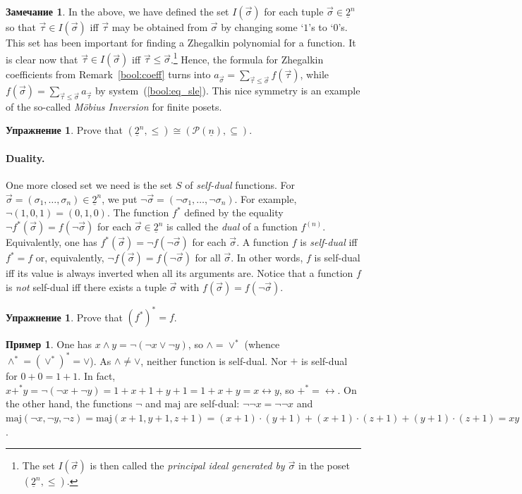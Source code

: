 \documentclass[12pt,notitlepage]{article}
\theoremstyle{plain}
\theoremstyle{definition}
\newtheorem{exc}[thm]{Упражнение}
\newtheorem{exm}[thm]{Пример}
\newtheorem{rem}[thm]{Замечание}
\theoremstyle{plain}
\newcommand{\sbs}{\subseteq}
\newcommand{\mP}{\mathcal{P}}
\newcommand{\ul}[1]{\underline{#1}}
\newcommand{\1}{\mathbf{1}}
\newcommand{\0}{\mathbf{0}}
\begin{document}
\begin{rem}
	In the above, we have defined the set $I(\vec \sigma)$ for each tuple $\vec \sigma \in \ul{2}^n$ so that $\vec \tau \in I(\vec\sigma)$ iff $\vec \tau$  may be obtained from $\vec \sigma$ by changing some `$1$'s to `$0$'s. This set has been important for finding a Zhegalkin polynomial for a function. It is clear now that $\vec \tau \in I(\vec \sigma)$ iff $\vec \tau \leq \vec \sigma$.\footnote{The set $I(\vec \sigma)$ is then called the \emph{principal ideal generated by $\vec \sigma$} in the poset $(\ul{2}^n, {\leq})$.} Hence, the formula for Zhegalkin coefficients from Remark~\ref{bool:coeff} turns into $a_{\vec \sigma} = \sum_{\vec\tau \leq \vec \sigma} f(\vec\tau)$, while $f(\vec \sigma) = \sum_{\vec\tau \leq \vec \sigma} a_{\vec\tau}$ by system~(\ref{bool:eq_sle}). This nice symmetry is an example of the so-called \emph{M\"obius Inversion} for finite posets.
\end{rem}
\begin{exc}
	Prove that $(\ul{2}^n, {\leq}) \cong (\mP(\ul{n}), {\sbs})$.
\end{exc}

\paragraph{Duality.}
One more closed set we need is the set $S$ of \emph{self-dual} functions. For $\vec \sigma = (\sigma_1, \ldots, \sigma_n) \in \ul{2}^n$, we put $\neg\vec\sigma = (\neg\sigma_1, \ldots, \neg\sigma_n)$. For example, $\neg (1,0,1) = (0,1,0)$. The function $f^*$ defined by the equality $\neg f^*(\vec \sigma) = f(\neg\vec\sigma)$ for each $\vec \sigma \in \ul{2}^n$ is called the \emph{dual} of a function $f^{(n)}$. Equivalently, one has $f^*(\vec \sigma) = \neg f(\neg\vec\sigma)$ for each $\vec \sigma$. A function $f$ is \emph{self-dual} iff $f^* = f$ or, equivalently, $\neg f(\vec \sigma) = f(\neg\vec\sigma)$ for all $\vec \sigma$. In other words, $f$ is self-dual iff its value is always inverted when all its arguments are. Notice that a function $f$ is \emph{not} self-dual iff there exists a tuple $\vec\sigma$ with $f(\vec \sigma) = f(\neg\vec \sigma)$.

\begin{exc}
	Prove that $(f^*)^* = f$.
\end{exc}

\begin{exm}
	One has $x \wedge y = \neg (\neg x \vee \neg y )$, so $\wedge = \vee^*$ (whence ${\wedge^*}= ({\vee^*})^* = \vee$). As ${\wedge} \neq {\vee}$, neither function is self-dual. Nor ${+}$ is self-dual for $0 + 0 = 1 + 1$. In fact, $x +^* y = \neg(\neg x + \neg y) = 1 + x + 1 + y + 1 = 1 + x + y = x \leftrightarrow y$, so ${+^*} = {\leftrightarrow}$. On the other hand, the functions ${\neg}$ and $\mathrm {maj}$ are self-dual: $\neg \neg x = \neg \neg x$ and $\mathrm {maj}(\neg x, \neg y, \neg z) = \mathrm {maj}(x + 1, y + 1, z + 1) = (x + 1)\cdot(y + 1) + (x + 1)\cdot(z + 1) + (y + 1)\cdot(z + 1) = xy + xz + yz + x + x + y + y + z + z + 1 + 1 + 1 = xy + xz + yz + 1 = \neg \mathrm {maj}(x,y,z)$.
\end{exm}
\end{document}
